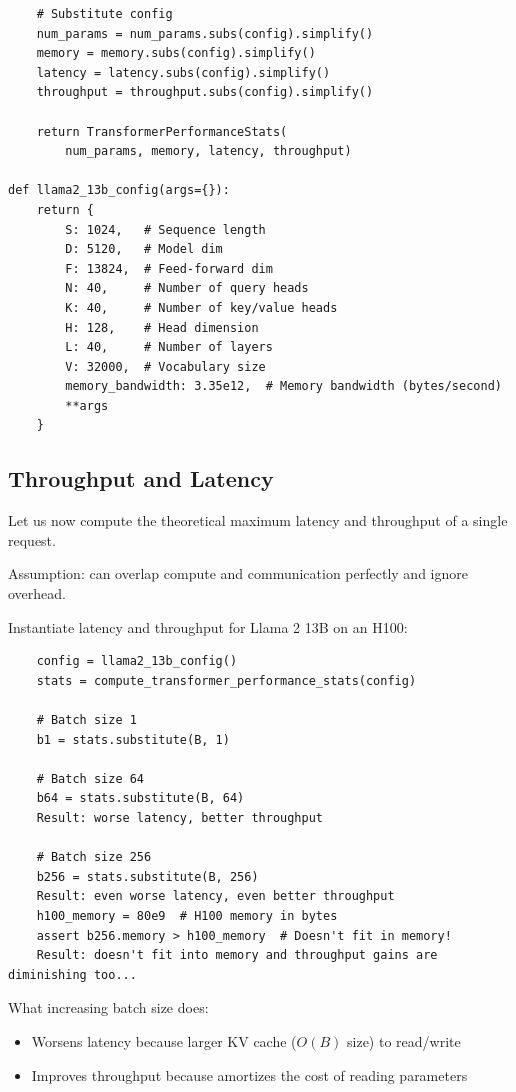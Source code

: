\documentclass[12pt,twoside]{article}
\begin{document}
\begin{verbatim}
    # Substitute config
    num_params = num_params.subs(config).simplify()  
    memory = memory.subs(config).simplify()  
    latency = latency.subs(config).simplify()  
    throughput = throughput.subs(config).simplify()  
    
    return TransformerPerformanceStats(
        num_params, memory, latency, throughput)

def llama2_13b_config(args={}):
    return {
        S: 1024,   # Sequence length
        D: 5120,   # Model dim
        F: 13824,  # Feed-forward dim
        N: 40,     # Number of query heads
        K: 40,     # Number of key/value heads
        H: 128,    # Head dimension
        L: 40,     # Number of layers
        V: 32000,  # Vocabulary size
        memory_bandwidth: 3.35e12,  # Memory bandwidth (bytes/second)
        **args
    }
\end{verbatim}

\subsection*{Throughput and Latency}

Let us now compute the theoretical maximum latency and throughput of a single request.

\begin{center}
    Assumption: can overlap compute and communication perfectly and ignore overhead.
\end{center}

Instantiate latency and throughput for Llama 2 13B on an H100:

\begin{verbatim}
    config = llama2_13b_config()
    stats = compute_transformer_performance_stats(config)
    
    # Batch size 1
    b1 = stats.substitute(B, 1)  
    
    # Batch size 64
    b64 = stats.substitute(B, 64)  
    Result: worse latency, better throughput
    
    # Batch size 256
    b256 = stats.substitute(B, 256)  
    Result: even worse latency, even better throughput
    h100_memory = 80e9  # H100 memory in bytes
    assert b256.memory > h100_memory  # Doesn't fit in memory!
    Result: doesn't fit into memory and throughput gains are diminishing too...
\end{verbatim}

What increasing batch size does:
\begin{itemize}
    \item Worsens latency because larger KV cache (\(O(B)\) size) to read/write
    \item Improves throughput because amortizes the cost of reading parameters
\end{itemize}
\end{document}
